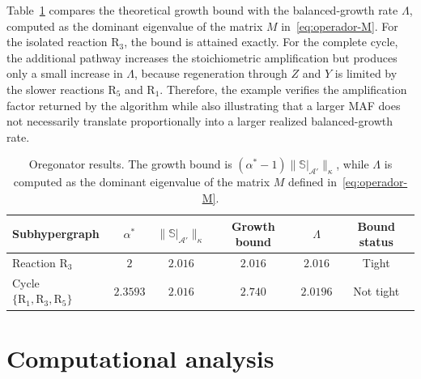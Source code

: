 \documentclass[a4paper,11pt,reqno]{amsart}
\begin{document}
Table~\ref{tab:oregonator_resultados} compares the theoretical growth bound
with the balanced-growth rate $\Lambda$, computed as the dominant eigenvalue
of the matrix $M$ in~\eqref{eq:operador-M}. For the isolated reaction
$\mathrm R_3$, the bound is attained exactly. For the complete cycle, the
additional pathway increases the stoichiometric amplification but produces
only a small increase in $\Lambda$, because regeneration through $Z$ and $Y$
is limited by the slower reactions $\mathrm R_5$ and $\mathrm R_1$.
Therefore, the example verifies the amplification factor returned by the
algorithm while also illustrating that a larger MAF does not necessarily
translate proportionally into a larger realized balanced-growth rate.
\begin{table}[h]
\centering
\begin{tabular}{lccccc}
\toprule
Subhypergraph &
$\alpha^*$ &
$\|\mathbb S|_{\mathcal A'}\|_{\kappa}$ &
Growth bound &
$\Lambda$ &
Bound status\\
\midrule
Reaction $\mathrm R_3$ &
$2$ &
$2.016$ &
$2.016$ &
$2.016$ &
Tight\\
Cycle $\{\mathrm R_1,\mathrm R_3,\mathrm R_5\}$ &
$2.3593$ &
$2.016$ &
$2.740$ &
$2.0196$ &
Not tight\\
\bottomrule
\end{tabular}
\caption{Oregonator results. The growth bound is
$(\alpha^*-1)\|\mathbb S|_{\mathcal A'}\|_{\kappa}$, while $\Lambda$ is
computed as the dominant eigenvalue of the matrix $M$ defined
in~\eqref{eq:operador-M}.}
\label{tab:oregonator_resultados}
\end{table}


\section{Computational analysis}\label{sec:exp}

\end{document}
